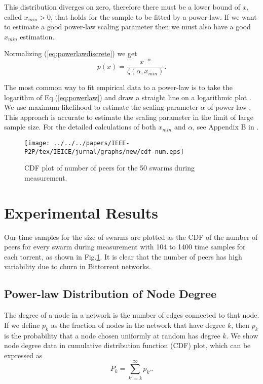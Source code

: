 This distribution diverges on zero, therefore there must be a lower bound of $x$, called $x_{min} > 0$, that holds for the sample to be fitted by a power-law. 
If we want to estimate a good power-law scaling parameter then we must also have a good $x_{min}$ estimation. 

Normalizing (\ref{eq:powerlawdiscrete})  we get
\begin{equation}
p(x)=\frac{x^{- \alpha}}{\zeta(\alpha,x_{min})}.
\end{equation} 

The most common way to fit empirical data to a power-law is to take the logarithm of Eq.(\ref{eq:powerlaw}) and draw a straight line on a logarithmic plot \cite{mitzenmacher2004brief}.  
We use maximum likelihood to estimate the scaling parameter $\alpha$ of power-law \cite{clauset2009power}.  
This approach is accurate to estimate the scaling parameter in the limit of large sample size. 
For the detailed calculations of both $x_{min}$ and $\alpha$, see Appendix B in \cite{clauset2009power}.

\begin{figure}[!t]
\begin{center}
\texttt{[image: ../../../papers/IEEE-P2P/tex/IEICE/jurnal/graphs/new/cdf-num.eps]}
\end{center}
\caption{CDF plot of number of peers for the 50 swarms during measurement.}
\label{fig:num_peers}
\end{figure}

\section{Experimental Results}\label{result}
Our time samples for the size of swarms are plotted as the CDF of the number of peers for every swarm during measurement with 104 to 1400 time samples for each torrent, as shown in Fig.\ref{fig:num_peers}. 
It is clear that the number of peers has high variability due to churn in Bittorrent networks. 

\subsection{Power-law Distribution of Node Degree}
The degree of a node in a network is the number of edges connected to that node. 
If we define $p_k$ as the  fraction of nodes in the network that have degree $k$, then $p_k$ is the probability that a node chosen uniformly at random has degree $k$. 
We show node degree data in cumulative distribution function (CDF) plot, which can be expressed as
\begin{equation}
P_k = \sum_{k'=k}^{\infty} p_{k'}.
\end{equation}

